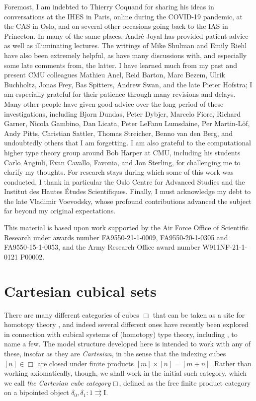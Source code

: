 \documentclass[11pt,reqno]{amsart}
\newcommand{\C}{\ensuremath{\boxempty}}
\newcommand{\I}{\ensuremath{\mathrm{I}}}
\theoremstyle{remark}
\theoremstyle{definition}
\begin{document}
Foremost, I am indebted to Thierry Coquand for sharing his ideas in conversations at the IHES in Paris, online during the COVID-19 pandemic, at the CAS in Oslo, and on several other occasions going back to the IAS in Princeton.  In many of the same places, Andr\'e Joyal has provided patient advice as well as illuminating lectures.   The writings of Mike Shulman and Emily Riehl have also been extremely helpful, as have many discussions with, and especially some late comments from, the latter.  I have learned much from my past and present CMU colleagues Mathieu Anel, Reid Barton, Marc Bezem, Ulrik Buchholtz, Jonas Frey, Bas Spitters, Andrew Swan, and the late Pieter Hofstra; I am especially grateful for their patience through many revisions and delays.  Many other people have given good advice over the long period of these investigations, including Bjorn Dundas, Peter Dybjer, Marcelo Fiore, Richard Garner, Nicola Gambino, Dan Licata, Peter LeFanu Lumsdaine, Per Martin-L\"of, Andy Pitts, Christian Sattler, Thomas Streicher, Benno van den Berg, and undoubtedly others that I am forgetting.
I am also grateful to the computational higher type theory group around Bob Harper at CMU, including his students Carlo Angiuli, Evan Cavallo, Favonia, and Jon Sterling, for challenging me to clarify my thoughts.  
For research stays during which some of this work was conducted, I thank in particular the Oslo Centre for Advanced Studies and the Institut des Hautes \'Etudes Scientifiques.   Finally, I must acknowledge my debt to the late Vladimir Voevodsky, whose profound contributions advanced the subject far beyond my original expectations.

This material is based upon work supported by the Air Force Office of Scientific Research under awards number FA9550-21-1-0009, FA9550-20-1-0305 and FA9550-15-1-0053, and the Army Research Office award number W911NF-21-1-0121 P00002.



\clearpage
\section{Cartesian cubical sets}\label{sec:cSet}

There are many different categories of cubes $\Box$ that can be taken as a site for homotopy theory \cite{Grandis:2003,BuchholtzMoorehouse}, and indeed several different ones have recently been explored in connection with cubical systems of (homotopy) type theory, including \cite{BCH,orton-pitts, CCHM:2018ctt,ABCHFL,CMS:2020}, to name a few.  The model structure developed here is intended to work with any of these, insofar as they are  \emph{Cartesian}, in the sense that the indexing cubes $[n]\in\Box$ are closed under finite products $[m]\times[n] = [m+n]$.   Rather than working axiomatically, though, we shall work in the initial such category, which we call \emph{the Cartesian cube category} $\C$, defined as the free finite product category on a bipointed object $\delta_0, \delta_1 : 1\rightrightarrows \I$.
\end{document}
